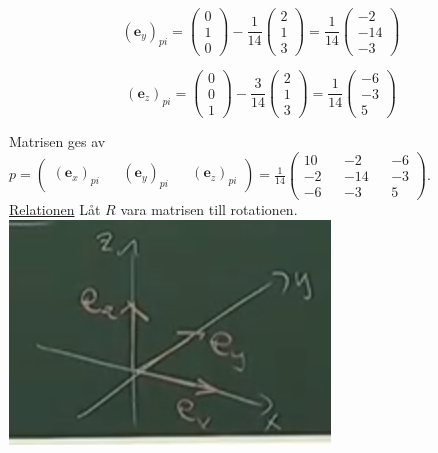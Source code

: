 \begin{equation*}
    (\bm{e}_{y})_{pi}=
    \begin{pmatrix}0\\1\\0\end{pmatrix}-\frac{1}{14}\begin{pmatrix}2\\1\\3\end{pmatrix}=
    \frac{1}{14}\begin{pmatrix}-2\\-14\\-3\end{pmatrix}
\end{equation*}

\begin{equation*}
    (\bm{e}_{z})_{pi}=
    \begin{pmatrix}0\\0\\1\end{pmatrix}-\frac{3}{14}\begin{pmatrix}2\\1\\3\end{pmatrix}=
    \frac{1}{14}\begin{pmatrix}-6\\-3\\5\end{pmatrix}
\end{equation*}

Matrisen ges av $p=\begin{pmatrix}(\bm{e}_{x})_{pi} && (\bm{e}_{y})_{pi} && (\bm{e}_{z})_{pi}\end{pmatrix}=\frac{1}{14}\begin{pmatrix}
    10&&-2&&-6\\
    -2&&-14&&-3\\
    -6&&-3&&5
\end{pmatrix}$.\\

\underline{Relationen} Låt $R$ vara matrisen till rotationen.\\

\includegraphics[scale=0.5]{imgs/img02.png}

